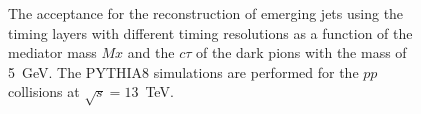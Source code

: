 \begin{figure}
\begin{center}

\end{center}
\caption{
The acceptance for the reconstruction of emerging jets using the timing layers with different timing resolutions as
a function of the mediator mass $Mx$ and the $c\tau$ of the dark pions with the mass of 5~GeV.
The PYTHIA8 simulations are performed
for the $pp$ collisions at $\sqrt{s}=13$~TeV. 
}
\label{fig:efficiency_med}
\end{figure}



